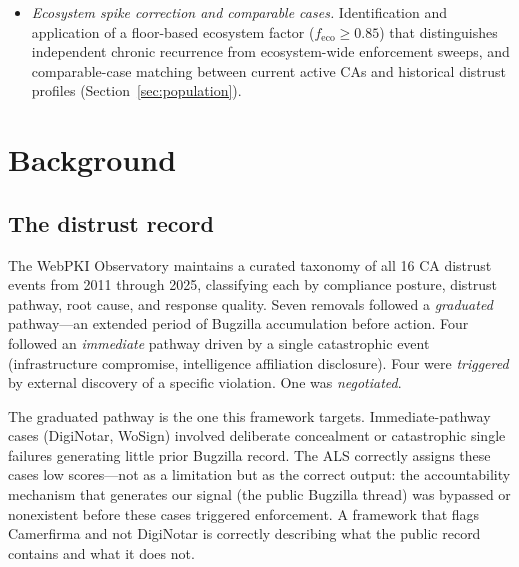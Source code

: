 \documentclass[10pt,twocolumn,letterpaper]{article}
\begin{document}
\begin{itemize}[noitemsep,topsep=2pt]
  distinct readings for three audiences. Root programs use EPS for engagement
  prioritization. CAs apply the signals to their own record to identify unresolved
  failure modes, monitoring gaps, and incident response quality deficits before they
  become governance conversations. Auditors use the chronic class inventory, self-report
  rate, and arc distribution as pre-engagement scoping inputs that direct fieldwork at
  the failure modes the public record already shows are unresolved---addressing the
  detection gap documented in prior work~\cite{p1} from the audit preparation side
  (Section~\ref{sec:discussion}).
\item \textit{Ecosystem spike correction and comparable cases.} Identification and
  application of a floor-based ecosystem factor ($f_\text{eco} \geq 0.85$) that
  distinguishes independent chronic recurrence from ecosystem-wide enforcement sweeps,
  and comparable-case matching between current active CAs and historical distrust
  profiles (Section~\ref{sec:population}).
\end{itemize}

\section{Background}
\label{sec:background}

\subsection{The distrust record}

The WebPKI Observatory maintains a curated taxonomy of all 16 CA distrust events from
2011 through 2025, classifying each by compliance posture, distrust pathway, root cause,
and response quality. Seven removals followed a \textit{graduated} pathway---an extended
period of Bugzilla accumulation before action. Four followed an \textit{immediate} pathway
driven by a single catastrophic event (infrastructure compromise, intelligence affiliation
disclosure). Four were \textit{triggered} by external discovery of a specific violation.
One was \textit{negotiated}.

The graduated pathway is the one this framework targets. Immediate-pathway cases (DigiNotar,
WoSign) involved deliberate concealment or catastrophic single failures generating little
prior Bugzilla record. The ALS correctly assigns these cases low scores---not as a
limitation but as the correct output: the accountability mechanism that generates our
signal (the public Bugzilla thread) was bypassed or nonexistent before these cases
triggered enforcement. A framework that flags Camerfirma and not DigiNotar is correctly
describing what the public record contains and what it does not.
\end{document}
